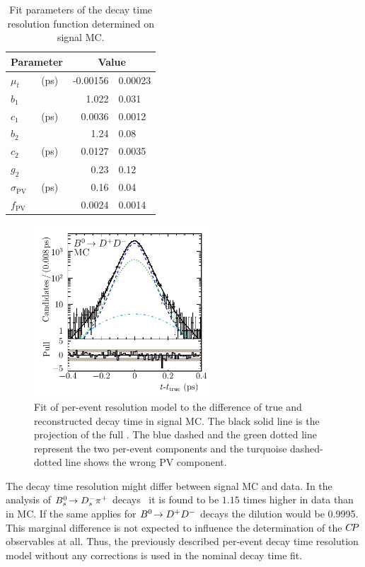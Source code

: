 \begin{table}[!htb]
\centering
\caption{Fit parameters of the decay time resolution function determined on \mbox{\BdToDD} signal MC.}
  \begin{tabular}{llr@{$\,\pm\,$}l}
    \toprule
    \multicolumn{2}{c}{Parameter}       &   \multicolumn{2}{c}{Value} \\
    \midrule
    $\mu_t$             &   (\si{\ps})  &   -0.00156    &   0.00023               \\
    $b_{1}$             &               &   1.022       &   0.031                 \\
    $c_{1}$             &   (\si{\ps})  &   0.0036      &   0.0012                \\
    $b_{2}$             &               &   1.24        &   0.08                  \\
    $c_{2}$             &   (\si{\ps})  &   0.0127      &   0.0035                \\
    $g_{2}$             &               &   0.23        &   0.12                  \\
    $\sigma_\text{PV}$  &   (\si{\ps})  &   0.16        &   0.04                  \\
    $f_\text{PV}$       &               &   0.0024      &   0.0014                \\
    \bottomrule
  \end{tabular}
\label{tab:b02dd:decaytimefit:resolution}
\end{table}
%
\begin{figure}[!htb]
\centering
\includegraphics[width=0.6\textwidth]{07-B02DD/tikz/pdf/obsTimeErr_True_pull_logy.pdf}
\caption{Fit of per-event resolution model to the difference of true and
reconstructed decay time in signal MC. The black solid line is the projection of the full
\PDF. The blue dashed and the green dotted line represent the two per-event
components and the turquoise dashed-dotted line shows the wrong PV component.}
\label{fig:b02dd:decaytimefit:resolution}
\end{figure}
%
The decay time resolution might differ between signal MC and data. In the
analysis of ${{B}^0_{s}}\!\rightarrow {\ensuremath{{D}^-_{s}}}{\ensuremath{{\pi}^+}}$ decays~\cite{LHCb-ANA-2012-068} it is found to be
$\num{1.15}$ times higher in data than in MC. If the same applies for ${{B}^0}\!\rightarrow {\ensuremath{{D}^+}}{\ensuremath{{D}^-}}$
decays the dilution would be \num{0.9995}. This marginal difference is not expected
to influence the determination of the ${C\!P}$ observables at all. Thus, the
previously described per-event decay time resolution model without any
corrections is used in the nominal decay time fit.
